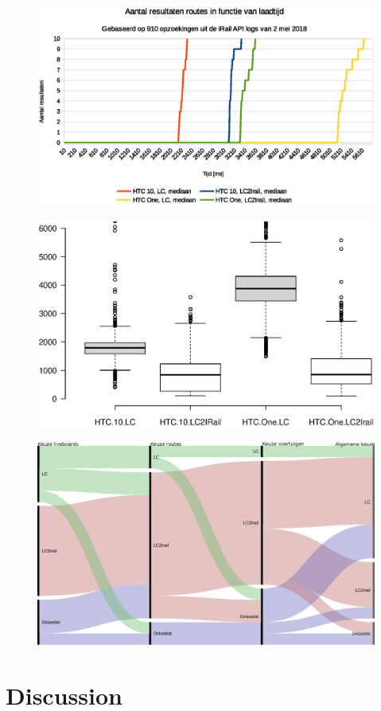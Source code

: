 \documentclass[twocolumn]{phdsymp} %
\begin{document}
\begin{figure}[ht]
	\begin{center}
		\includegraphics[width=.50\textwidth]{images/dief_routes_gemiddeld.eps}
		\caption{\label{fig:route} }
	\end{center}
\end{figure}

\begin{figure}[ht]
	\begin{center}
		\includegraphics[trim=3cm 4cm 0 0, width=.50\textwidth]{images/boxplot_vehicles.eps}
		\caption{\label{fig:vehicle} }
	\end{center}
\end{figure}

\begin{figure}[ht]
	\begin{center}
		\includegraphics[width=.50\textwidth]{images/alluvial_user_choice.eps}
		\caption{\label{fig:choices} }
	\end{center}
\end{figure}

\section{Discussion}
 
\end{document}
